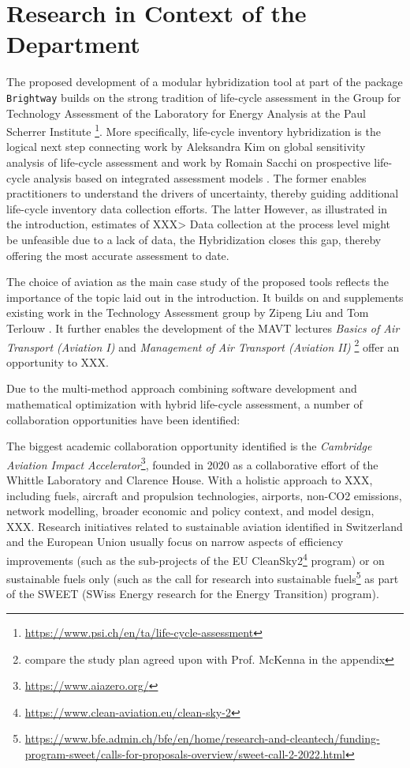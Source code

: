 \documentclass{article}
\begin{document}
\section{Research in Context of the Department}

    The proposed development of a modular hybridization tool at part of the package \texttt{Brightway} builds on the strong tradition of life-cycle assessment in the Group for Technology Assessment of the Laboratory for Energy Analysis at the Paul Scherrer Institute \footnote{\url{https://www.psi.ch/en/ta/life-cycle-assessment}}. More specifically, life-cycle inventory hybridization is the logical next step connecting work by Aleksandra Kim on global sensitivity analysis of life-cycle assessment \cite{kim_aleksandra-kimgwp_uncertainties_2022}\cite{kim_aleksandra-kimgsa_framework_2021}\cite{paulillo_influential_2021} and work by Romain Sacchi on prospective life-cycle analysis based on integrated assessment models \cite{noauthor_premise_2022}\cite{sacchi_prospective_2022}. The former enables practitioners to understand the drivers of uncertainty, thereby guiding additional life-cycle inventory data collection efforts. The latter 
    However, as illustrated in the introduction, estimates of XXX> Data collection at the process level might be unfeasible due to a lack of data, the 
    Hybridization closes this gap, thereby offering the most accurate assessment to date.
    
    The choice of aviation as the main case study of the proposed tools reflects the importance of the topic laid out in the introduction. It builds on and supplements existing work in the Technology Assessment group by Zipeng Liu and Tom Terlouw \cite{terlouw_large-scale_2022}. It further enables the development of the MAVT lectures \textit{Basics of Air Transport (Aviation I)} and \textit{Management of Air Transport (Aviation II)} \footnote{compare the study plan agreed upon with Prof. McKenna in the appendix} offer an opportunity to XXX.
    
    Due to the multi-method approach combining software development and mathematical optimization with hybrid life-cycle assessment, a number of collaboration opportunities have been identified:
	
	The biggest academic collaboration opportunity identified is the \textit{Cambridge Aviation Impact Accelerator}\footnote{\url{https://www.aiazero.org/}}, founded in 2020 as a collaborative effort of the Whittle Laboratory and Clarence House. With a holistic approach to XXX, including fuels, aircraft and propulsion technologies, airports, non-CO2 emissions, network modelling, broader economic and policy context, and model design, XXX. Research initiatives related to sustainable aviation identified in Switzerland and the European Union usually focus on narrow aspects of efficiency improvements (such as the sub-projects of the EU CleanSky2\footnote{\url{https://www.clean-aviation.eu/clean-sky-2}} program) or on sustainable fuels only (such as the call for research into sustainable fuels\footnote{\url{https://www.bfe.admin.ch/bfe/en/home/research-and-cleantech/funding-program-sweet/calls-for-proposals-overview/sweet-call-2-2022.html}} as part of the SWEET (SWiss Energy research for the Energy Transition) program).
    
\end{document}
